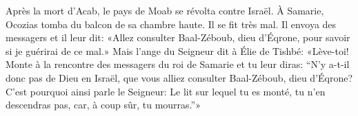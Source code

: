 Après la mort d’Acab, le pays de Moab se révolta contre Israël.
À Samarie, Ocozias tomba du balcon de sa chambre haute.
	Il se fit très mal.
Il envoya des messagers et il leur dit:
	«Allez consulter Baal-Zéboub, dieu d’Éqrone, pour savoir si je guérirai de ce mal.»
Mais l’ange du Seigneur dit à Élie de Tishbé:
	«Lève-toi! Monte à la rencontre des messagers du roi de Samarie et tu leur diras:
	“N’y a-t-il donc pas de Dieu en Israël,
	que vous alliez consulter Baal-Zéboub, dieu d’Éqrone?
	C’est pourquoi ainsi parle le Seigneur:
	Le lit sur lequel tu es monté, tu n’en descendras pas, car, à coup sûr, tu mourras.”»
